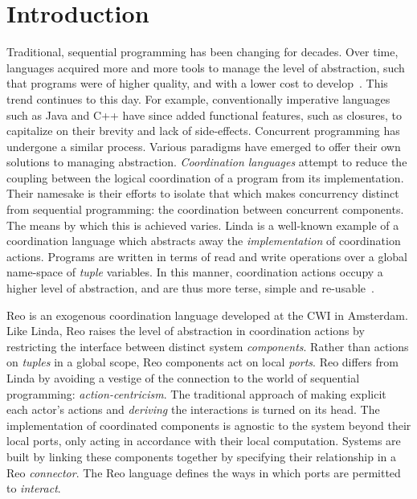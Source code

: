 \chapter{Introduction}	


Traditional, sequential programming has been changing for decades. Over time, languages acquired more and more tools to manage the level of abstraction, such that programs were of higher quality, and with a lower cost to develop~\cite{shaw1984abstraction}. This trend continues to this day. For example, conventionally imperative languages such as Java and C++ have since added functional features, such as closures, to capitalize on their brevity and lack of side-effects. Concurrent programming has undergone a similar process. Various paradigms have emerged to offer their own solutions to managing abstraction. \textit{Coordination languages} attempt to reduce the coupling between the logical coordination of a program from its implementation. Their namesake is their efforts to isolate that which makes concurrency distinct from sequential programming: the coordination between concurrent components. The means by which this is achieved varies. Linda is a well-known example of a coordination language which abstracts away the \textit{implementation} of coordination actions. Programs are written in terms of read and write operations over a global name-space of \textit{tuple} variables. In this manner, coordination actions occupy a higher level of abstraction, and are thus more terse, simple and re-usable~\cite{gelernter1985generative}.


Reo is an exogenous coordination language developed at the CWI in Amsterdam. Like Linda, Reo raises the level of abstraction in coordination actions by restricting the interface between distinct system \textit{components}. Rather than actions on \textit{tuples} in a global scope, Reo components act on local \textit{ports}. Reo differs from Linda by avoiding a vestige of the connection to the world of sequential programming: \textit{action-centricism}. The traditional approach of making explicit each actor's actions and \textit{deriving} the interactions is turned on its head. The implementation of coordinated components is agnostic to the system beyond their local ports, only acting in accordance with their local computation. Systems are built by linking these components together by specifying their relationship in a Reo \textit{connector}. The Reo language defines the ways in which ports are permitted to \textit{interact}. 

